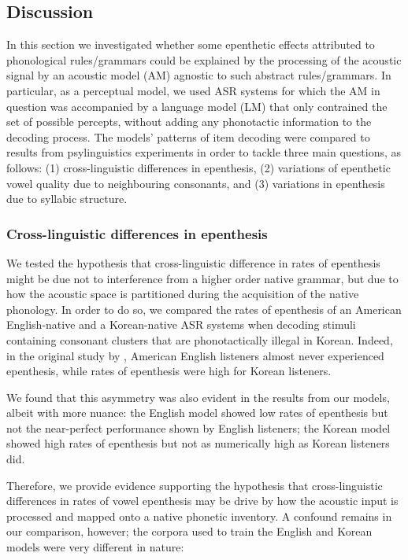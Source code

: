 {\subsection{Discussion}
In this section we investigated whether some epenthetic effects attributed to phonological rules/grammars could be explained by the processing of the acoustic signal by an acoustic model (AM) agnostic to such abstract rules/grammars. In particular, as a perceptual model, we used ASR systems for which the AM in question was accompanied by a language model (LM) that only contrained the set of possible percepts, without adding any phonotactic information to the decoding process. The models' patterns of item decoding were compared to results from psylinguistics experiments in order to tackle three main questions, as follows: (1) cross-linguistic differences in epenthesis, (2) variations of epenthetic vowel quality due to neighbouring consonants, and (3) variations in epenthesis due to syllabic structure.

\subsubsection{Cross-linguistic differences in epenthesis}
We tested the hypothesis that cross-linguistic difference in rates of epenthesis might be due not to interference from a higher order native grammar, but due to how the acoustic space is partitioned during the acquisition of the native phonology.
In order to do so, we compared the rates of epenthesis of an American English-native and a Korean-native ASR systems when decoding stimuli containing consonant clusters that are phonotactically illegal in Korean. Indeed, in the original study by \cite{durvasula2015}, American English listeners almost never experienced epenthesis, while rates of epenthesis were high for Korean listeners.

We found that this asymmetry was also evident in the results from our models, albeit with more nuance: the English model showed low rates of epenthesis but not the near-perfect performance shown by English listeners; the Korean model showed high rates of epenthesis but not as numerically high as Korean listeners did.

Therefore, we provide evidence supporting the hypothesis that cross-linguistic differences in rates of vowel epenthesis may be drive by how the acoustic input is processed and mapped onto a native phonetic inventory. A confound remains in our comparison, however; the corpora used to train the English and Korean models were very different in nature:

}

